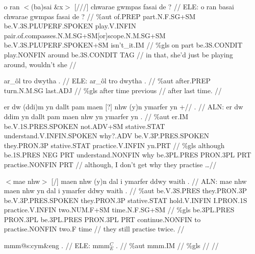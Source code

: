 \documentclass[a4paper,10pt]{article}
\begin{document}
\ex
\begingl[lingstyle=gergl]
\glchat o ran $<$(ba)sai \&x$>$ [///] chwarae gwmpas fasai de ? //
\glsurface ELE:  o ran basai chwarae gwmpas fasai de ?  //
\glauto \%aut  of{\scriptsize .PREP} part{\scriptsize .N.F.SG+SM} be{\scriptsize .V.3S.PLUPERF.SPOKEN} play{\scriptsize .V.INFIN} pair{\scriptsize .of.compasses.N.M.SG+SM[or]scope.N.M.SG+SM} be{\scriptsize .V.3S.PLUPERF.SPOKEN+SM} isn't\_it{\scriptsize .IM}   //
\glmanual \%gls  on part be{\scriptsize .3S.CONDIT} play{\scriptsize .NONFIN} around be{\scriptsize .3S.CONDIT} TAG   //
\gleng in that, she'd just be playing around, wouldn't she //
\endgl
\xe

\ex
\begingl[lingstyle=gergl]
\glchat ar\_ôl tro dwytha . //
\glsurface ELE:  ar\_ôl tro dwytha .  //
\glauto \%aut  after{\scriptsize .PREP} turn{\scriptsize .N.M.SG} last{\scriptsize .ADJ}   //
\glmanual \%gls  after time previous   //
\gleng after last time. //
\endgl
\xe

\ex
\begingl[lingstyle=gergl]
\glchat er dw (ddi)m yn dallt pam maen [?] nhw (y)n ymarfer yn +// . //
\glsurface ALN:  er dw ddim yn dallt pam maen nhw yn ymarfer yn .  //
\glauto \%aut  er{\scriptsize .IM} be{\scriptsize .V.1S.PRES.SPOKEN} not{\scriptsize .ADV+SM} stative{\scriptsize .STAT} understand{\scriptsize .V.INFIN.SPOKEN} why?.ADV be{\scriptsize .V.3P.PRES.SPOKEN} they{\scriptsize .PRON.3P} stative{\scriptsize .STAT} practice{\scriptsize .V.INFIN} yn{\scriptsize .PRT}   //
\glmanual \%gls  although be{\scriptsize .1S.PRES} NEG PRT understand{\scriptsize .NONFIN} why be{\scriptsize .3PL.PRES} PRON{\scriptsize .3PL} PRT practise{\scriptsize .NONFIN} PRT   //
\gleng although, I don't get why they practise \dots  //
\endgl
\xe

\ex
\begingl[lingstyle=gergl]
\glchat $<$mae nhw$>$ [/] maen nhw (y)n dal i ymarfer ddwy waith . //
\glsurface ALN:  mae nhw maen nhw yn dal i ymarfer ddwy waith .  //
\glauto \%aut  be{\scriptsize .V.3S.PRES} they{\scriptsize .PRON.3P} be{\scriptsize .V.3P.PRES.SPOKEN} they{\scriptsize .PRON.3P} stative{\scriptsize .STAT} hold{\scriptsize .V.INFIN} I{\scriptsize .PRON.1S} practice{\scriptsize .V.INFIN} two{\scriptsize .NUM.F+SM} time{\scriptsize .N.F.SG+SM}   //
\glmanual \%gls  be{\scriptsize .3PL.PRES} PRON{\scriptsize .3PL} be{\scriptsize .3PL.PRES} PRON{\scriptsize .3PL} PRT continue{\scriptsize .NONFIN} to practise{\scriptsize .NONFIN} two{\scriptsize .F} time   //
\gleng they still practise twice. //
\endgl
\xe

\ex
\begingl[lingstyle=gergl]
\glchat mmm@s:cym\&eng . //
\glsurface ELE:  mmm$^{C}_{E}$ .  //
\glauto \%aut  mmm{\scriptsize .IM}   //
\glmanual \%gls     //
\gleng  //
\endgl
\xe
\end{document}
